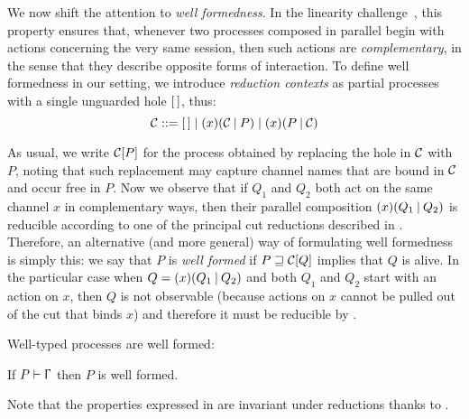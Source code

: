We now shift the attention to \emph{well formedness}. In the linearity
challenge~\cite{CarboneEtAl24}, this property ensures that, whenever two
processes composed in parallel begin with actions concerning the very same
session, then such actions are \emph{complementary}, in the sense that they
describe opposite forms of interaction. To define well formedness in our
setting, we introduce \emph{reduction contexts} as partial processes with a
single unguarded hole $[\,]$, thus:
\[
    \mathcal{C} ::= [\,] \mid (x)(\mathcal{C}\mathbin| P) \mid (x)(P\mathbin|\mathcal{C})
\]

As usual, we write $\mathcal{C}[P]$ for the process obtained by replacing
the hole in $\mathcal{C}$ with $P$, noting that such replacement may
capture channel names that are bound in $\mathcal{C}$ and occur free in
$P$.
%
Now we observe that if $Q_1$ and $Q_2$ both act on the same channel $x$ in
complementary ways, then their parallel composition $(x)(Q_1\mathbin| Q_2)$ is
reducible according to one of the principal cut reductions described in
. Therefore, an alternative (and more general) way of
formulating well formedness is simply this:
%
we say that $P$ is \emph{well formed} if $P \sqsupseteq \mathcal{C}[Q]$ implies
that $Q$ is alive. In the particular case when $Q = (x)(Q_1\mathbin| Q_2)$ and both
$Q_1$ and $Q_2$ start with an action on $x$, then $Q$ is not observable (because
actions on $x$ cannot be pulled out of the cut that binds $x$) and therefore it
must be reducible by .

Well-typed processes are well formed:

\begin{theorem}
    \label{thm:type-safety}
    If $\wtp{P}\Context$ then $P$ is well formed.
\end{theorem}

Note that the properties expressed in  are
invariant under reductions thanks to .
